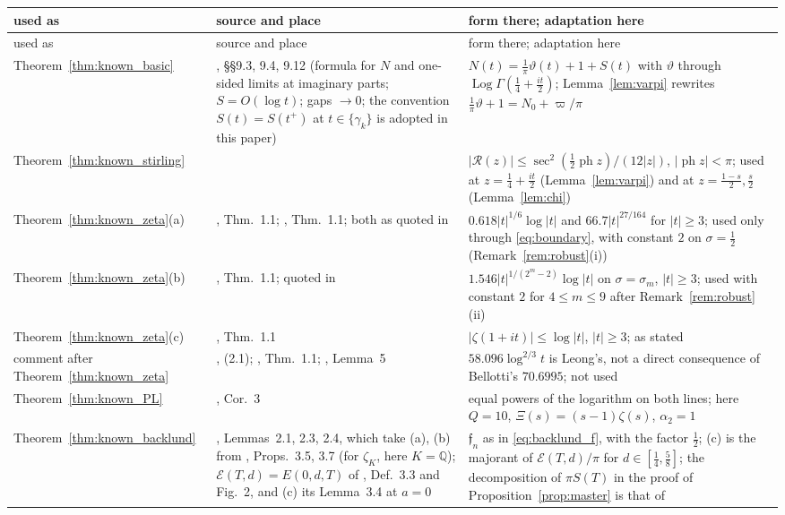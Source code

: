 \documentclass[11pt,a4paper]{article}
\makeatletter
\numberwithin{equation}{section}
\DeclareRobustCommand{\CGref}[1]{\ref{#1}}
\DeclareRobustCommand{\CGeqref}[1]{\eqref{#1}}
\DeclareRobustCommand{\CGcite}[2][]{\if\relax\detokenize{#1}\relax\cite{#2}\else\cite[#1]{#2}\fi}
\let\CG@origref\ref
\let\CG@origeqref\eqref
\newcommand{\CG@gettip}[1]{\@ifundefined{CGTip@#1}{#1}{\csname CGTip@#1\endcsname}}
\newcommand{\CG@getbib}[1]{\@ifundefined{CGBib@#1}{#1}{\csname CGBib@#1\endcsname}}
\DeclareRobustCommand{\CGref}[1]{\pdftooltip{\CG@origref{#1}}{\CG@gettip{#1}}}
\DeclareRobustCommand{\CGeqref}[1]{\pdftooltip{\CG@origeqref{#1}}{\CG@gettip{#1}}}
\DeclareRobustCommand{\CGcite}[2][]{\pdftooltip{\if\relax\detokenize{#1}\relax\cite{#2}\else\cite[#1]{#2}\fi}{\CG@getbib{#2}}}
\theoremstyle{definition}
\theoremstyle{remark}
\newcommand{\Nz}{N_0} %
\makeatother
\begin{document}
\begin{center}\small
\begin{longtable}{p{}p{}p{}}
\toprule used as & source and place & form there; adaptation here\\\midrule\endfirsthead
\toprule used as & source and place & form there; adaptation here\\\midrule\endhead
\bottomrule\endfoot
Theorem~\CGref{thm:known_basic} & \CGcite{Titchmarsh1986}, \S\S9.3, 9.4, 9.12 (formula for $N$ and one-sided limits at imaginary parts; $S=O(\log t)$; gaps $\to0$; the convention $S(t)=S(t^+)$ at $t\in\{\gamma_k\}$ is adopted in this paper) & $N(t)=\frac1\pi\vartheta(t)+1+S(t)$ with $\vartheta$ through $\operatorname{Log}\Gamma(\frac14+\frac{it}2)$; Lemma~\CGref{lem:varpi} rewrites $\frac1\pi\vartheta+1=\Nz+\varpi/\pi$\\
Theorem~\CGref{thm:known_stirling} & \CGcite[\S5.11(ii)]{DLMF} & $|\mathcal R(z)|\le\sec^2(\frac12\operatorname{ph}z)/(12|z|)$, $|\operatorname{ph}z|<\pi$; used at $z=\frac14+\frac{it}2$ (Lemma~\CGref{lem:varpi}) and at $z=\frac{1-s}2,\frac s2$ (Lemma~\CGref{lem:chi})\\
Theorem~\CGref{thm:known_zeta}(a) & \CGcite{HiaryPatelYang2024}, Thm.~1.1; \CGcite{PatelYang2023}, Thm.~1.1; both as quoted in \CGcite[\S2, display before (2.3)]{BellottiWong2025} & $0.618|t|^{1/6}\log|t|$ and $66.7|t|^{27/164}$ for $|t|\ge3$; used only through \CGeqref{eq:boundary}, with constant $2$ on $\sigma=\frac12$ (Remark~\CGref{rem:robust}(i))\\
Theorem~\CGref{thm:known_zeta}(b) & \CGcite{Yang2024}, Thm.~1.1; quoted in \CGcite[(2.4)]{BellottiWong2025} & $1.546|t|^{1/(2^m-2)}\log|t|$ on $\sigma=\sigma_m$, $|t|\ge3$; used with constant $2$ for $4\le m\le9$ after Remark~\CGref{rem:robust}(ii)\\
Theorem~\CGref{thm:known_zeta}(c) & \CGcite{Patel2022}, Thm.~1.1 & $|\zeta(1+it)|\le\log|t|$, $|t|\ge3$; as stated\\
comment after Theorem~\CGref{thm:known_zeta} & \CGcite{BellottiWong2025}, (2.1); \CGcite{Bellotti2024}, Thm.~1.1; \CGcite{Leong2024}, Lemma~5 & $58.096\log^{2/3}t$ is Leong's, not a direct consequence of Bellotti's $70.6995$; not used\\
Theorem~\CGref{thm:known_PL} & \CGcite{Fiori2025}, Cor.~3 & equal powers of the logarithm on both lines; here $Q=10$, $\Xi(s)=(s-1)\zeta(s)$, $\alpha_2=1$\\
Theorem~\CGref{thm:known_backlund} & \CGcite{BellottiWong2025}, Lemmas~2.1, 2.3, 2.4, which take (a), (b) from \CGcite{HasanalizadeShenWong2021}, Props.~3.5, 3.7 (for $\zeta_K$, here $K=\mathbb Q$); $\mathcal E(T,d)=E(0,d,T)$ of \CGcite{BennettEtAl2021}, Def.~3.3 and Fig.~2, and (c) its Lemma~3.4 at $a=0$ & $\mathfrak f_n$ as in \CGeqref{eq:backlund_f}, with the factor $\frac12$; (c) is the majorant of $\mathcal E(T,d)/\pi$ for $d\in[\frac14,\frac58]$; the decomposition of $\pi S(T)$ in the proof of Proposition~\CGref{prop:master} is that of \CGcite[\S3]{BellottiWong2025}\\

\end{longtable}
\end{center}
\end{document}
